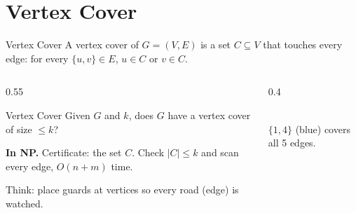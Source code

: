 \documentclass[10pt,aspectratio=169]{beamer}
\begin{document}
\section{Vertex Cover}

\begin{frame}{Vertex Cover}
  A \alert{vertex cover} of $G = (V, E)$ is a set $C \subseteq V$ that
  touches every edge: for every $\{u, v\} \in E$, $u \in C$ or $v \in C$.

  \begin{columns}[c]
    \begin{column}{0.55\textwidth}
      \begin{block}{Vertex Cover}
        Given $G$ and $k$, does $G$ have a vertex cover of size $\le k$?
      \end{block}

      \medskip
      \textbf{In NP.} Certificate: the set $C$. Check $|C| \le k$ and scan
      every edge, $O(n + m)$ time.

      \medskip
      \small Think: place guards at vertices so every road (edge) is
      watched.
    \end{column}
    \begin{column}{0.4\textwidth}
      \begin{center}
      \\[2pt]
      \small $\{1, 4\}$ (blue) covers all 5 edges.
      \end{center}
    \end{column}
  \end{columns}
\end{frame}
\end{document}

